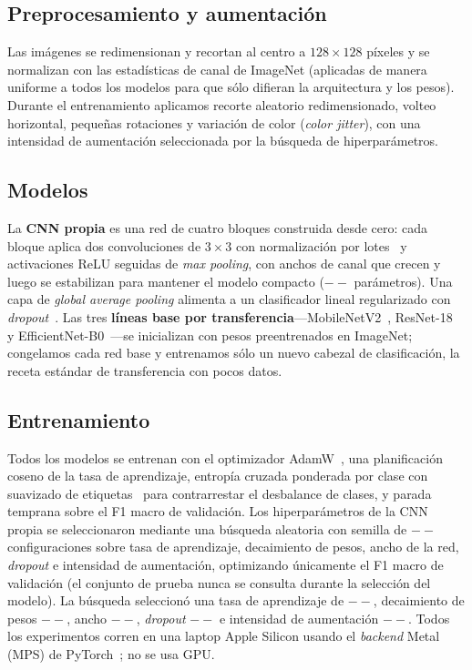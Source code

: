 \documentclass[10pt]{article}
\providecommand{\paramsCustom}{--}\providecommand{\trainparamsCustom}{--}
\providecommand{\hpotrials}{--}\providecommand{\hpobestfone}{--}\providecommand{\hpolr}{--}\providecommand{\hpowd}{--}\providecommand{\hpowidth}{--}\providecommand{\hpodropout}{--}\providecommand{\hpoaug}{--}
\begin{document}
\subsection{Preprocesamiento y aumentación}
Las imágenes se redimensionan y recortan al centro a $128\times128$ píxeles y se
normalizan con las estadísticas de canal de ImageNet (aplicadas de manera uniforme a
todos los modelos para que sólo difieran la arquitectura y los pesos). Durante el
entrenamiento aplicamos recorte aleatorio redimensionado, volteo horizontal, pequeñas
rotaciones y variación de color (\emph{color jitter}), con una intensidad de
aumentación seleccionada por la búsqueda de hiperparámetros.

\subsection{Modelos}
La \textbf{CNN propia} es una red de cuatro bloques construida desde cero: cada bloque
aplica dos convoluciones de $3\times3$ con normalización por
lotes~\cite{ioffe2015batchnorm} y activaciones ReLU seguidas de \emph{max pooling}, con
anchos de canal que crecen y luego se estabilizan para mantener el modelo compacto
($\paramsCustom$ parámetros). Una capa de \emph{global average pooling} alimenta a un
clasificador lineal regularizado con \emph{dropout}~\cite{srivastava2014dropout}. Las
tres \textbf{líneas base por transferencia}---MobileNetV2~\cite{sandler2018mobilenetv2},
ResNet-18~\cite{he2016resnet} y EfficientNet-B0~\cite{tan2019efficientnet}---se
inicializan con pesos preentrenados en ImageNet; congelamos cada red base y entrenamos
sólo un nuevo cabezal de clasificación, la receta estándar de transferencia con pocos
datos.

\subsection{Entrenamiento}
Todos los modelos se entrenan con el optimizador AdamW~\cite{loshchilov2019adamw,kingma2014adam},
una planificación coseno de la tasa de aprendizaje, entropía cruzada ponderada por
clase con suavizado de etiquetas~\cite{szegedy2016labelsmoothing} para contrarrestar el
desbalance de clases, y parada temprana sobre el F1 macro de validación. Los
hiperparámetros de la CNN propia se seleccionaron mediante una búsqueda aleatoria con
semilla de $\hpotrials$ configuraciones sobre tasa de aprendizaje, decaimiento de
pesos, ancho de la red, \emph{dropout} e intensidad de aumentación, optimizando
únicamente el F1 macro de validación (el conjunto de prueba nunca se consulta durante
la selección del modelo). La búsqueda seleccionó una tasa de aprendizaje de $\hpolr$,
decaimiento de pesos $\hpowd$, ancho $\hpowidth$, \emph{dropout} $\hpodropout$ e
intensidad de aumentación $\hpoaug$. Todos los experimentos corren en una laptop Apple
Silicon usando el \emph{backend} Metal (MPS) de PyTorch~\cite{paszke2019pytorch}; no se
usa GPU.
\end{document}

